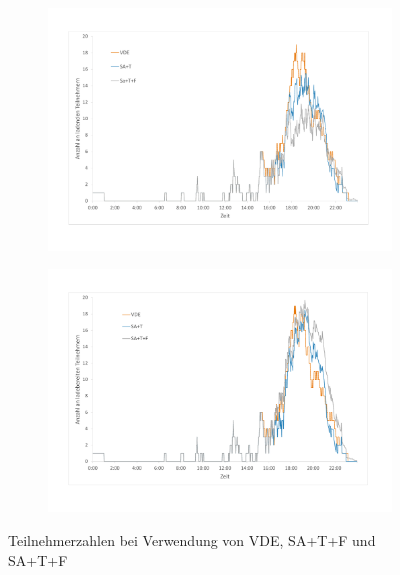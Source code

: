 \begin{figure}
	\begin{subfigure}{\linewidth}
		\includegraphics[scale=0.45]{img/ohneTrafo/Teilnehmer_laden.pdf}
        \label{ABB_oT_Teil1}
	\end{subfigure}
	\begin{subfigure}{\linewidth}
		\includegraphics[scale=0.45]{img/ohneTrafo/Teilnehmer_bereit2.pdf}
        \label{ABB_oT_teil2}
	\end{subfigure}
	\caption{Teilnehmerzahlen bei Verwendung von VDE, SA+T+F und SA+T+F}
\end{figure}

